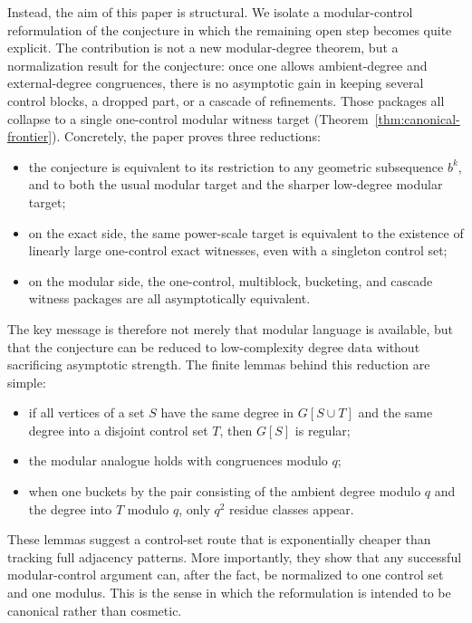 \documentclass[11pt]{amsart}
\theoremstyle{definition}
\begin{document}
Instead, the aim of this paper is structural. We isolate a modular-control reformulation of the
conjecture in which the remaining open step becomes quite explicit. The contribution is not a new
modular-degree theorem, but a normalization result for the conjecture: once one allows
ambient-degree and external-degree congruences, there is no asymptotic gain in keeping several
control blocks, a dropped part, or a cascade of refinements. Those packages all collapse to a
single one-control modular witness target (Theorem~\ref{thm:canonical-frontier}). Concretely, the
paper proves three reductions:

\begin{itemize}
  \item the conjecture is equivalent to its restriction to any geometric subsequence $b^k$, and to
    both the usual modular target and the sharper low-degree modular target;
  \item on the exact side, the same power-scale target is equivalent to the existence of linearly
    large one-control exact witnesses, even with a singleton control set;
  \item on the modular side, the one-control, multiblock, bucketing, and cascade witness packages
    are all asymptotically equivalent.
\end{itemize}

The key message is therefore not merely that modular language is available, but that the conjecture
can be reduced to low-complexity degree data without sacrificing asymptotic strength. The finite
lemmas behind this reduction are simple:

\begin{itemize}
  \item if all vertices of a set $S$ have the same degree in $G[S \cup T]$ and the same degree into
    a disjoint control set $T$, then $G[S]$ is regular;
  \item the modular analogue holds with congruences modulo $q$;
  \item when one buckets by the pair consisting of the ambient degree modulo $q$ and the degree into
    $T$ modulo $q$, only $q^2$ residue classes appear.
\end{itemize}

These lemmas suggest a control-set route that is exponentially cheaper than tracking full
adjacency patterns. More importantly, they show that any successful modular-control argument can,
after the fact, be normalized to one control set and one modulus. This is the sense in which the
reformulation is intended to be canonical rather than cosmetic.
\end{document}
